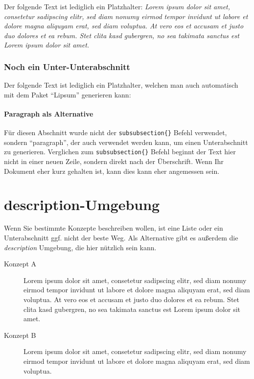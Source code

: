 Der folgende Text ist lediglich ein Platzhalter: \emph{Lorem ipsum dolor sit amet, consetetur sadipscing elitr, sed diam nonumy eirmod tempor invidunt ut labore et dolore magna aliquyam erat, sed diam voluptua. At vero eos et accusam et justo duo dolores et ea rebum. Stet clita kasd gubergren, no sea takimata sanctus est Lorem ipsum dolor sit amet.}


\subsubsection{Noch ein Unter-Unterabschnitt}
Der folgende Text ist lediglich ein Platzhalter, welchen man auch automatisch mit dem Paket ``Lipsum'' generieren kann: 
\textit{\lipsum[1]}	

\paragraph{Paragraph als Alternative} %
\label{par:paragraph_als_alternative}
Für diesen Abschnitt wurde nicht der \texttt{subsubsection\{\}} Befehl verwendet, sondern ``paragraph'', der auch verwendet werden kann, um einen Unterabschnitt zu generieren. Verglichen zum \texttt{subsubsection\{\}} Befehl beginnt der Text hier nicht in einer neuen Zeile, sondern direkt nach der Überschrift. Wenn Ihr Dokument eher kurz gehalten ist, kann dies kann eher angemessen sein.



\section{description-Umgebung} %
\label{sec:description_umgebung}
Wenn Sie bestimmte Konzepte beschreiben wollen, ist eine Liste oder ein Unterabschnitt ggf. nicht der beste Weg. Als Alternative gibt es außerdem die \emph{description} Umgebung, die hier nützlich sein kann.

\begin{description}
	\item[Konzept A] Lorem ipsum dolor sit amet, consetetur sadipscing elitr, sed diam nonumy eirmod tempor invidunt ut labore et dolore magna aliquyam erat, sed diam voluptua. At vero eos et accusam et justo duo dolores et ea rebum. Stet clita kasd gubergren, no sea takimata sanctus est Lorem ipsum dolor sit amet.
	\item[Konzept B] Lorem ipsum dolor sit amet, consetetur sadipscing elitr, sed diam nonumy eirmod tempor invidunt ut labore et dolore magna aliquyam erat, sed diam voluptua.
\end{description}








